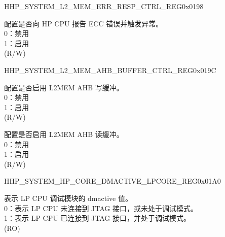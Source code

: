 \begin{register}{H}{HP\_SYSTEM\_L2\_MEM\_ERR\_RESP\_CTRL\_REG}{0x0198}\label{regdesc:HPSYSTEML2MEMERRRESPCTRLREG}
%
%
\regnewline%
\begin{regdesc}\begin{reglist}
\label{fielddesc:HPSYSTEML2MEMERRRESPEN}\item [HP\_SYSTEM\_L2\_MEM\_ERR\_RESP\_EN] 配置是否向 HP CPU 报告 ECC 错误并触发异常。\\
0：禁用\\
1：启用\\
(R/W)
\end{reglist}\end{regdesc}
\end{register}


\begin{register}{H}{HP\_SYSTEM\_L2\_MEM\_AHB\_BUFFER\_CTRL\_REG}{0x019C}\label{regdesc:HPSYSTEML2MEMAHBBUFFERCTRLREG}
%
%
%
\regnewline%
\begin{regdesc}\begin{reglist}
\label{fielddesc:HPSYSTEML2MEMAHBWRBUFFEREN}\item [HP\_SYSTEM\_L2\_MEM\_AHB\_WRBUFFER\_EN] 配置是否启用 L2MEM AHB 写缓冲。\\
0：禁用\\
1：启用\\
(R/W)
\label{fielddesc:HPSYSTEML2MEMAHBRDBUFFEREN}\item [HP\_SYSTEM\_L2\_MEM\_AHB\_RDBUFFER\_EN] 配置是否启用 L2MEM AHB 读缓冲。\\
0：禁用\\
1：启用\\
(R/W)
\end{reglist}\end{regdesc}
\end{register}


\begin{register}{H}{HP\_SYSTEM\_HP\_CORE\_DMACTIVE\_LPCORE\_REG}{0x01A0}\label{regdesc:HPSYSTEMHPCOREDMACTIVELPCOREREG}
%
%
\regnewline%
\begin{regdesc}\begin{reglist}
\label{fielddesc:HPSYSTEMCOREDMACTIVELPCORE}\item [HP\_SYSTEM\_CORE\_DMACTIVE\_LPCORE] 表示 LP CPU 调试模块的 dmactive 值。\\
0：表示 LP CPU 未连接到 JTAG 接口，或未处于调试模式。\\
1：表示 LP CPU 已连接到 JTAG 接口，并处于调试模式。\\
(RO)
\end{reglist}\end{regdesc}
\end{register}


